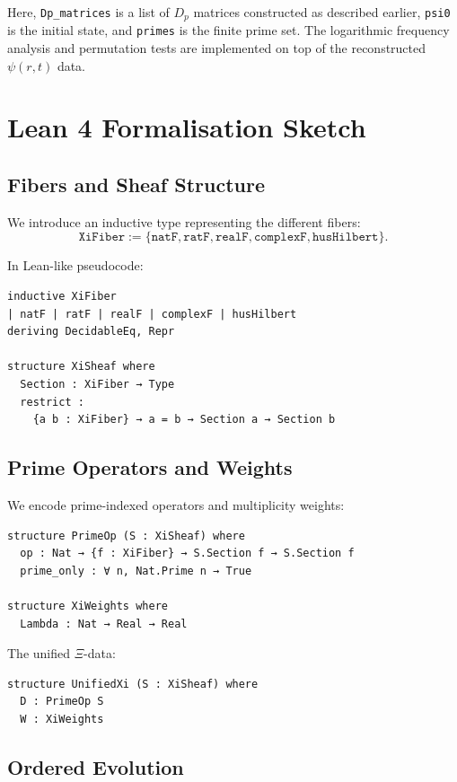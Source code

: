 \documentclass[11pt]{article}
\begin{document}
Here, \verb|Dp_matrices| is a list of $D_p$ matrices constructed as
described earlier, \verb|psi0| is the initial state, and
\verb|primes| is the finite prime set. The logarithmic frequency
analysis and permutation tests are implemented on top of the
reconstructed $\psi(r,t)$ data.

\section{Lean 4 Formalisation Sketch}

\subsection{Fibers and Sheaf Structure}

We introduce an inductive type representing the different fibers:
\[
  \texttt{XiFiber} :=
    \{\texttt{natF}, \texttt{ratF}, \texttt{realF}, \texttt{complexF},
    \texttt{husHilbert}\}.
\]

In Lean-like pseudocode:
\begin{verbatim}
inductive XiFiber
| natF | ratF | realF | complexF | husHilbert
deriving DecidableEq, Repr

structure XiSheaf where
  Section : XiFiber → Type
  restrict :
    {a b : XiFiber} → a = b → Section a → Section b
\end{verbatim}

\subsection{Prime Operators and Weights}

We encode prime-indexed operators and multiplicity weights:

\begin{verbatim}
structure PrimeOp (S : XiSheaf) where
  op : Nat → {f : XiFiber} → S.Section f → S.Section f
  prime_only : ∀ n, Nat.Prime n → True

structure XiWeights where
  Lambda : Nat → Real → Real
\end{verbatim}

The unified $\Xi$-data:
\begin{verbatim}
structure UnifiedXi (S : XiSheaf) where
  D : PrimeOp S
  W : XiWeights
\end{verbatim}

\subsection{Ordered Evolution}
\end{document}
